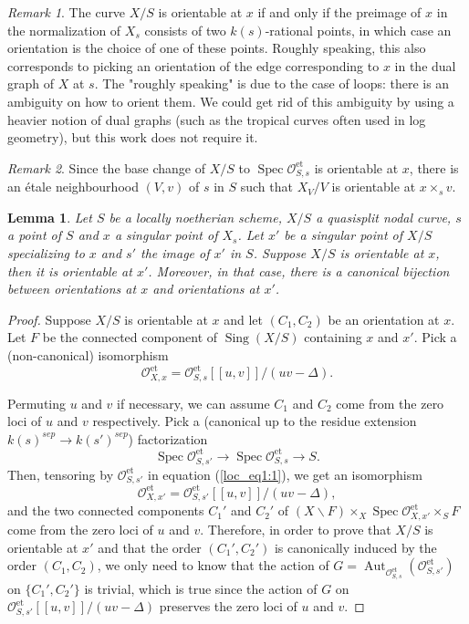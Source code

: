 \documentclass[a4paper,10pt,twoside]{article}
\newcommand{\on}[1]{\operatorname{#1}}
\renewcommand{\O}{\mathcal{O}}
\DeclareMathOperator{\spec}{Spec}
\DeclareMathOperator{\sing}{Sing}
\DeclareMathOperator{\aut}{Aut}
\newtheorem{lem}[thm]{Lemma}
\theoremstyle{definition}
\theoremstyle{remark}
\newtheorem{rem}{Remark}[thm]
\renewcommand{\on}[1]{\operatorname{#1}}
\begin{document}
\begin{rem}
The curve $X/S$ is orientable at $x$ if and only if the preimage of $x$ in the normalization of $X_s$ consists of two $k(s)$-rational points, in which case an orientation is the choice of one of these points. Roughly speaking, this also corresponds to picking an orientation of the edge corresponding to $x$ in the dual graph of $X$ at $s$. The "roughly speaking" is due to the case of loops: there is an ambiguity on how to orient them. We could get rid of this ambiguity by using a heavier notion of dual graphs (such as the tropical curves often used in log geometry), but this work does not require it.
\end{rem}

\begin{rem}\label{remark:orientations_exist_locally}
Since the base change of $X/S$ to $\spec\O_{S,s}^{\on{et}}$ is orientable at $x$, there is an \'etale neighbourhood $(V,v)$ of $s$ in $S$ such that $X_V/V$ is orientable at $x\times_s v$.
\end{rem}

\begin{lem}\label{lemma:orientations_pass_to_generization}
Let $S$ be a locally noetherian scheme, $X/S$ a quasisplit nodal curve, $s$ a point of $S$ and $x$ a singular point of $X_s$. Let $x'$ be a singular point of $X/S$ specializing to $x$ and $s'$ the image of $x'$ in $S$. Suppose $X/S$ is orientable at $x$, then it is orientable at $x'$. Moreover, in that case, there is a canonical bijection between orientations at $x$ and orientations at $x'$.
\end{lem}

\begin{proof}
Suppose $X/S$ is orientable at $x$ and let $(C_1,C_2)$ be an orientation at $x$. Let $F$ be the connected component of $\sing(X/S)$ containing $x$ and $x'$. Pick a (non-canonical) isomorphism
\begin{equation}\label{loc_eq1:1}
\O_{X,x}^{\on{et}}=\O_{S,s}^{\on{et}}[[u,v]]/(uv-\Delta).
\end{equation}

Permuting $u$ and $v$ if necessary, we can assume $C_1$ and $C_2$ come from the zero loci of $u$ and $v$ respectively. Pick a (canonical up to the residue extension $k(s)^{sep} \to k(s')^{sep}$) factorization
\[
\spec \O_{S,s'}^{\on{et}} \to \spec \O_{S,s}^{\on{et}} \to S.
\]
Then, tensoring by $\O_{S,s'}^{\on{et}}$ in equation (\ref{loc_eq1:1}), we get an isomorphism
\[
\O_{X,x'}^{\on{et}}=\O_{S,s'}^{\on{et}}[[u,v]]/(uv-\Delta),
\]
and the two connected components $C_1'$ and $C_2'$ of $(X\backslash F)\times_X \spec\O_{X,x'}^{\on{et}}\times_S F$ come from the zero loci of $u$ and $v$. Therefore, in order to prove that $X/S$ is orientable at $x'$ and that the order $(C_1',C_2')$ is canonically induced by the order $(C_1,C_2)$, we only need to know that the action of $G=\aut_{\O_{S,s}^{\on{et}}}(\O_{S,s'}^{\on{et}})$ on $\{C_1',C_2'\}$ is trivial, which is true since the action of $G$ on $\O_{S,s'}^{\on{et}}[[u,v]]/(uv-\Delta)$ preserves the zero loci of $u$ and $v$.
\end{proof}
\end{document}
